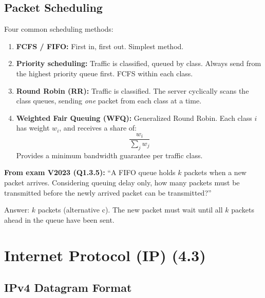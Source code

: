 \subsection{Packet Scheduling}

\begin{exambox}
Four common scheduling methods:

\begin{enumerate}[noitemsep]
    \item \textbf{FCFS / FIFO:} First in, first out. Simplest method.
    \item \textbf{Priority scheduling:} Traffic is classified, queued by class. Always send from the highest priority queue first. FCFS within each class.
    \item \textbf{Round Robin (RR):} Traffic is classified. The server cyclically scans the class queues, sending \emph{one} packet from each class at a time.
    \item \textbf{Weighted Fair Queuing (WFQ):} Generalized Round Robin. Each class $i$ has weight $w_i$, and receives a share of:
    \[
    \frac{w_i}{\sum_j w_j}
    \]
    Provides a minimum bandwidth guarantee per traffic class.
\end{enumerate}

\medskip
\textbf{From exam V2023 (Q1.3.5):} ``A FIFO queue holds $k$ packets when a new packet arrives. Considering queuing delay only, how many packets must be transmitted before the newly arrived packet can be transmitted?''

Answer: $k$ packets (alternative c). The new packet must wait until all $k$ packets ahead in the queue have been sent.
\end{exambox}

\section{Internet Protocol (IP) (4.3)}

\subsection{IPv4 Datagram Format}

